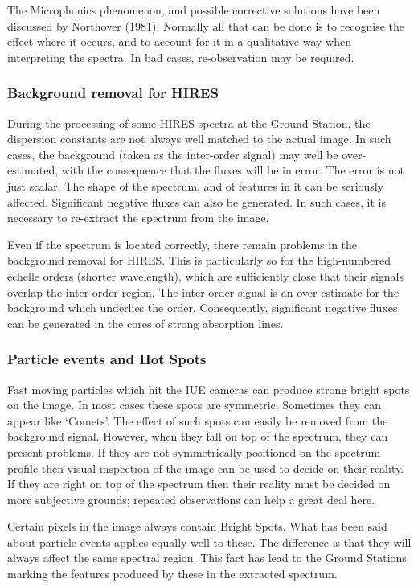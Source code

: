 The Microphonics phenomenon, and possible corrective solutions have been
discussed by North\-over (1981)\@.
Normally all that can be done is to recognise
the effect where it occurs, and to account for it in a qualitative way when
interpreting the spectra.  In bad cases, re-observation may be required.

\subsubsection{Background removal for HIRES}

During the processing of some HIRES spectra at the Ground Station, the
dispersion constants are not always well matched to the actual image.  In such
cases, the background (taken as the inter-order signal) may well be
over-estimated, with the consequence that the fluxes will be in error.  The
error is not just scalar.  The shape of the spectrum, and of features in
it can be seriously affected.  Significant negative fluxes can also be
generated.  In such cases, it is necessary to re-extract the spectrum from the
image.

Even if the spectrum is located correctly, there remain problems in the
background removal for HIRES\@.  This is particularly so for the high-numbered
\'{e}chelle orders (shorter wavelength), which are sufficiently close
that their signals overlap the inter-order region.  The inter-order signal is an
over-estimate for the background which underlies the order.  Consequently,
significant negative fluxes can be generated in the cores of strong
absorption lines.

\subsubsection{Particle events and Hot Spots}

Fast moving particles which hit the IUE cameras can produce strong bright
spots on the image.  In most cases these spots are symmetric.  Sometimes they
can appear like `Comets'\@.  The effect of such spots can easily be removed from
the background signal.  However, when they fall on top of the spectrum, they
can present problems.  If they are not symmetrically positioned on the
spectrum profile then visual inspection of the image can be used to decide
on their reality.  If they are right on top of the spectrum then their
reality must be decided on more subjective grounds; repeated observations can
help a great deal here.

Certain pixels in the image always contain Bright Spots.  What has been
said about particle events applies equally well to these.  The difference is
that they will always affect the same spectral region.  This fact has
lead to the Ground Stations marking the features produced by these in the
extracted spectrum.

